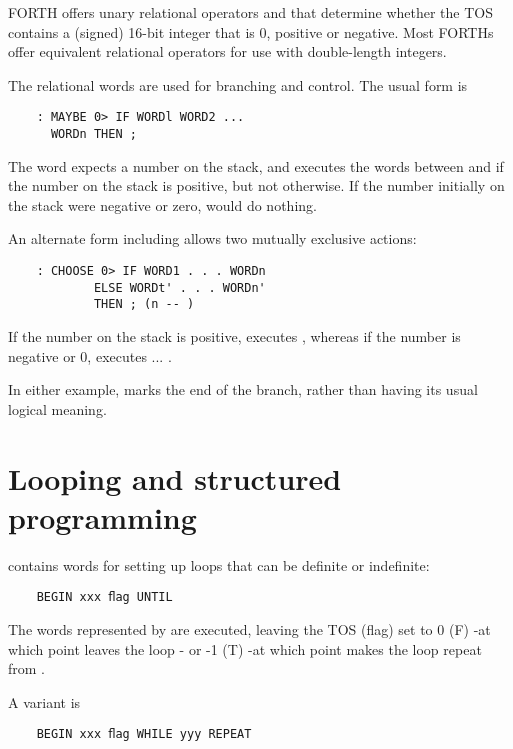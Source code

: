 FORTH offers unary relational operators  and  that determine whether the TOS contains a (signed) 16-bit integer that is 0, positive or negative. Most FORTHs offer equivalent relational operators for use with double-length integers.

The relational words are used for branching and control. The usual form is

\begin{lstlisting}
    : MAYBE 0> IF WORDl WORD2 ...
      WORDn THEN ;
\end{lstlisting}

The word  expects a number on the stack, and executes the words between  and  if the number on the stack is positive, but not otherwise. If the number initially on the stack were negative or zero,  would do nothing.

An alternate form including  allows two mutually exclusive actions:

\begin{lstlisting}
    : CHOOSE 0> IF WORD1 . . . WORDn
            ELSE WORDt' . . . WORDn'
            THEN ; (n -- )
\end{lstlisting}

If the number on the stack is positive,  executes , whereas if the number is negative or 0,  executes  ... .

In either example,  marks the end of the branch, rather than having its usual logical meaning.

\section{Looping and structured programming}

 contains words for setting up loops that can be definite or indefinite:

\begin{lstlisting}
    BEGIN xxx ﬂag UNTIL
\end{lstlisting}

The words represented by  are executed, leaving the TOS (ﬂag) set to 0 (F) -at which point  leaves the loop - or -1 (T) -at which point  makes the loop repeat from .

A variant is
\begin{lstlisting}
    BEGIN xxx ﬂag WHILE yyy REPEAT
\end{lstlisting}

